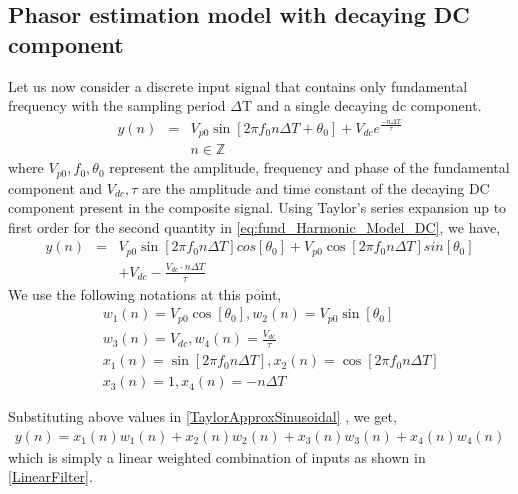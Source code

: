 \documentclass{UCF_ETD}
\begin{document}
\subsection{Phasor estimation model with decaying DC component}
Let us now consider a discrete input signal that contains only fundamental frequency with the sampling period
$\Delta$T and a single decaying dc component.
\begin{eqnarray}
\label{eq:fund_Harmonic_Model_DC}
y(n)&{}={}&V_{p0} \sin[2\pi f_0 n\Delta T+ \theta_0]+V_{dc} e^{\frac{-n\Delta T}{\tau}}    \nonumber\\
&&n \in \mathbb{Z}
\end{eqnarray}
where \begin{math} V_{p0},f_0,\theta_0 \end{math} represent the amplitude, frequency and phase of the fundamental component and \begin{math} V_{dc},\tau \end{math} are the amplitude and time constant of the decaying DC component present in the composite signal. Using Taylor's series expansion up to first order for the second quantity in \eqref{eq:fund_Harmonic_Model_DC}, we have,
\begin{eqnarray} \label{TaylorApproxSinusoidal}
y(n)&{}={}&V_{p0} \sin[2\pi f_0 n\Delta T]cos[\theta_0]  +V_{p0} \cos[2\pi f_0 n\Delta T]sin[\theta_0]  \nonumber \\
&&+V_{dc} -\frac{V_{dc}\cdot n\Delta T}{\tau}
\end{eqnarray}
We use the following notations at this point,
\begin{eqnarray*}
&&w_1(n)=  V_{p0} \cos[\theta_0], w_2(n)=  V_{p0} \sin[\theta_0]  \\
&&w_3(n)=  V_{dc} , w_4(n)=  \frac{V_{dc}}{\tau} \\
&&x_1(n)=  \sin[2\pi f_0 n\Delta T], x_2(n)=  \cos[2\pi f_0 n\Delta T]  \\
&&x_3(n)=  1, x_4(n)=  -n\Delta T
\end{eqnarray*}

Substituting above values in \eqref{TaylorApproxSinusoidal} , we get,
\begin{eqnarray*}
y(n) = x_1(n)w_1(n)+x_2(n)w_2(n)+x_3(n)w_3(n)+x_4(n)w_4(n)
\end{eqnarray*}
which is simply a linear weighted combination of inputs as shown in \eqref{LinearFilter}.
\end{document}
